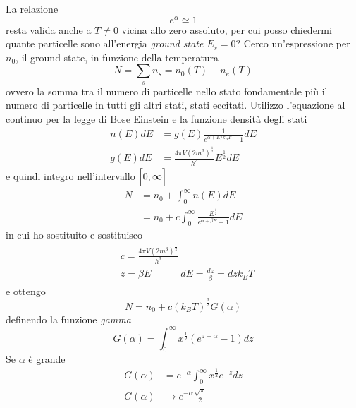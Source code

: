 La relazione 
\begin{equation}
e^{\alpha} \simeq 1
\end{equation}
resta valida anche a $T \not= 0$ vicina allo zero assoluto, per cui posso chiedermi quante particelle sono all'energia \emph{ground state} $E_s = 0$?
Cerco un'espressione per $n_0$, il ground state, in funzione della temperatura
\begin{equation}
N = \sum_s n_s = n_0 (T) + n_e(T)
\end{equation}
ovvero la somma tra il numero di particelle nello stato fondamentale più il numero di particelle in tutti gli altri stati, stati eccitati.
Utilizzo l'equazione al continuo per la legge di Bose Einstein e la funzione densità degli stati 
\begin{equation}
\begin{split}
n(E)dE & = g(E) \frac{ 1}{e^{ \alpha + E / k_B T } - 1 } dE \\
g(E)dE & = \frac{4\pi V (2m^3)^{ \frac{1}{2} }}{h^3} E^{ \frac{1}{2} } dE
\end{split}
\end{equation}
e quindi integro nell'intervallo $\Bigl[  0, \infty  \Bigr]$
\begin{equation}
\begin{split}
N & = n_0 + \int_0^{\infty} n(E)dE \\
& = n_0 + c \int_0^{\infty} \frac{E^{ \frac{1}{2} }}{e^{ \alpha + \beta E } - 1} dE
\end{split}
\end{equation}
in cui ho sostituito e sostituisco
\begin{equation}
\begin{split}
& c = \frac{4\pi V (2m^3)^{ \frac{1}{2} }}{h^3} \\
& z= \beta E \quad\quad\quad dE = \frac{dz}{\beta} = dz k_B T
\end{split}
\end{equation}
e ottengo
\begin{equation}
N = n_0 + c(k_B T)^{\frac{3}{2}} G(\alpha)
\label{N_di_gamma}
\end{equation}
definendo la funzione \emph{gamma}
\begin{equation}
G(\alpha) = \int_0^{\infty} x^{ \frac{1}{2} } (e^{ z + \alpha } - 1) dz
\end{equation}
Se $\alpha$ è grande
\begin{equation}
\begin{split}
G(\alpha) & = e^{ - \alpha} \int_0^{\infty} x^{ \frac{1}{2} } e^{ -z } dz \\
G(\alpha) & \to e^{-\alpha} \frac{\sqrt{\pi}}{2}
\end{split}
\end{equation}
